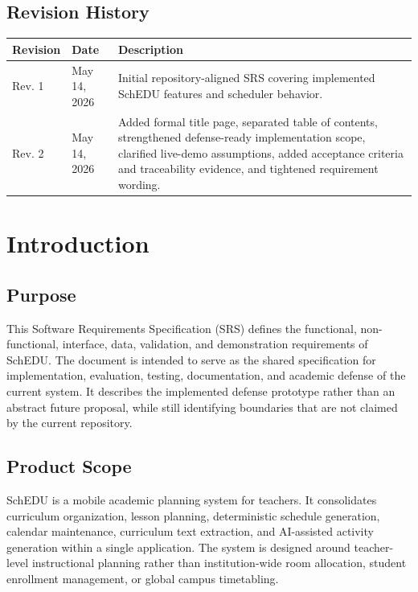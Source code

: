 \documentclass[12pt]{article}
\begin{document}
\subsection*{Revision History}

\begin{longtable}{|L{2.5cm}|L{2.8cm}|L{8.4cm}|}
\hline
\textbf{Revision} & \textbf{Date} & \textbf{Description} \\
\hline
Rev. 1 & May 14, 2026 & Initial repository-aligned SRS covering implemented SchEDU features and scheduler behavior. \\
\hline
Rev. 2 & May 14, 2026 & Added formal title page, separated table of contents, strengthened defense-ready implementation scope, clarified live-demo assumptions, added acceptance criteria and traceability evidence, and tightened requirement wording. \\
\hline
\end{longtable}

\newpage
{}

\section{Introduction}

\subsection{Purpose}

This Software Requirements Specification (SRS) defines the functional,
non-functional, interface, data, validation, and demonstration requirements of
SchEDU. The document is intended to serve as the shared specification for
implementation, evaluation, testing, documentation, and academic defense of the
current system. It describes the implemented defense prototype rather than an
abstract future proposal, while still identifying boundaries that are not claimed
by the current repository.

\subsection{Product Scope}

SchEDU is a mobile academic planning system for teachers. It consolidates
curriculum organization, lesson planning, deterministic schedule generation,
calendar maintenance, curriculum text extraction, and AI-assisted activity
generation within a single application. The system is designed around
teacher-level instructional planning rather than institution-wide room
allocation, student enrollment management, or global campus timetabling.
\end{document}
